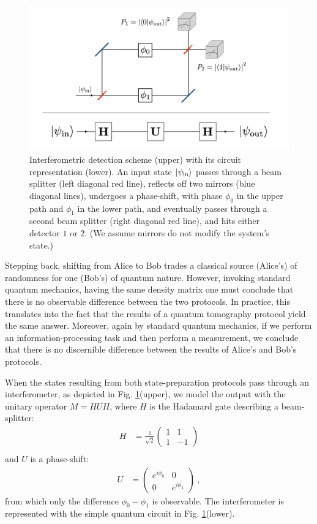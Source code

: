 \documentclass[draft,nofootinbib,prl,twocolumn,showpacs,showkeys,groupaddress,preprintnumbers,floatfix]{revtex4-1}
\newcommand{\1}{\mathbbm{1}}
\begin{document}
\begin{figure}[h]
\centering
\includegraphics[width=.9\columnwidth]{img/InterferometerCircuit.png}
\caption{Interferometric detection scheme (upper) with its circuit
	representation (lower). An input state $\ket{\psi_{\mathrm{in}}}$ passes
	through a beam splitter (left diagonal red line), reflects off two mirrors
	(blue diagonal lines), undergoes a phase-shift, with phase $\phi_0$ in the
	upper path and $\phi_1$ in the lower path, and eventually passes through a
	second beam splitter (right diagonal red line), and hits either detector
	$1$ or $2$. (We assume mirrors do not modify the system's state.)
	}
\label{fig:interferometer} 
\end{figure}

Stepping back, shifting from Alice to Bob trades a classical source (Alice's)
of randomness for one (Bob's) of quantum nature. However, invoking standard
quantum mechanics, having the same density matrix one must conclude that there
is no observable difference between the two protocols. In practice, this
translates into the fact that the results of a quantum tomography protocol
yield the same answer. Moreover, again by standard quantum mechanics, if we
perform an information-processing task and then perform a measurement, we
conclude that there is no discernible difference between the results of Alice's
and Bob's protocols.

When the states resulting from both state-preparation protocols pass through an
interferometer, as depicted in Fig. \ref{fig:interferometer}(upper), we model
the output with the unitary operator $M = HUH$, where $H$ is the Hadamard gate
describing a beam-splitter:
\begin{align*}
H & = \frac{1}{\sqrt{2}}
  \left( \begin{array}{cc}
  1 & 1 \\1 & -1
  \end{array} \right) \\
\end{align*}
and $U$ is a phase-shift:
\begin{align*}
U & = \left( \begin{array}{cc}
  e^{i\phi_0} & 0 \\ 0 & e^{i\phi_1}
  \end{array} \right)
  ~,
\end{align*}
from which only the difference $\phi_0-\phi_1$ is observable. The
interferometer is represented with the simple quantum circuit in Fig.
\ref{fig:interferometer}(lower).
\end{document}
